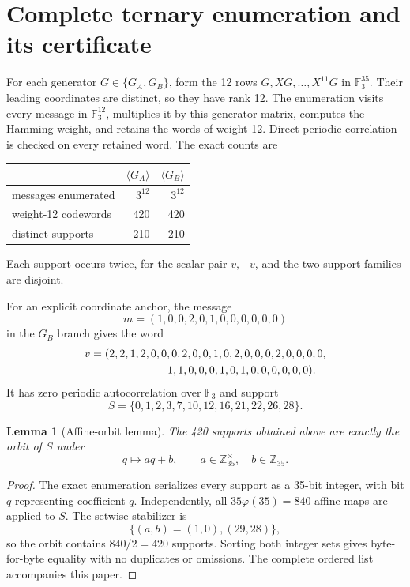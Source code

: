 \documentclass[10pt]{article}
\newtheorem{lemma}{Lemma}
\newcommand{\F}{\mathbb F}
\newcommand{\Z}{\mathbb Z}
\begin{document}
\section{Complete ternary enumeration and its certificate}

For each generator $G\in\{G_A,G_B\}$, form the 12 rows
$G,XG,\ldots,X^{11}G$ in $\F_3^{35}$.  Their leading coordinates are
distinct, so they have rank 12.  The enumeration visits every message in
$\F_3^{12}$, multiplies it by this generator matrix, computes the Hamming
weight, and retains the words of weight 12.  Direct periodic correlation is
checked on every retained word.  The exact counts are
\begin{center}
\begin{tabular}{lrr}
\toprule
&$\langle G_A\rangle$&$\langle G_B\rangle$\\
\midrule
messages enumerated&$3^{12}$&$3^{12}$\\
weight-12 codewords&420&420\\
distinct supports&210&210\\
\bottomrule
\end{tabular}
\end{center}
Each support occurs twice, for the scalar pair $v,-v$, and the two support
families are disjoint.

For an explicit coordinate anchor, the message
\[
 m=(1,0,0,2,0,1,0,0,0,0,0,0)
\]
in the $G_B$ branch gives the word
\[
\begin{split}
v={}&(2,2,1,2,0,0,0,2,0,0,1,0,2,0,0,0,2,0,0,0,0,\\
    &\hspace{20mm}1,1,0,0,0,1,0,1,0,0,0,0,0,0).
\end{split}
\]
It has zero periodic autocorrelation over $\F_3$ and support
\begin{equation}\label{eq:canonical-support}
 S=\{0,1,2,3,7,10,12,16,21,22,26,28\}.
\end{equation}

\begin{lemma}[Affine-orbit lemma]\label{lem:affine-orbit}
The 420 supports obtained above are exactly the orbit of $S$ under
\[
 q\longmapsto aq+b,\qquad
 a\in\Z_{35}^{\times},\quad b\in\Z_{35}.
\]
\end{lemma}

\begin{proof}
The exact enumeration serializes every support as a 35-bit integer, with bit
$q$ representing coefficient $q$.  Independently, all
$35\varphi(35)=840$ affine maps are applied to $S$.  The setwise stabilizer is
\[
 \{(a,b)=(1,0),(29,28)\},
\]
so the orbit contains $840/2=420$ supports.  Sorting both integer sets gives
byte-for-byte equality with no duplicates or omissions.  The complete ordered
list accompanies this paper.
\end{proof}
\end{document}
